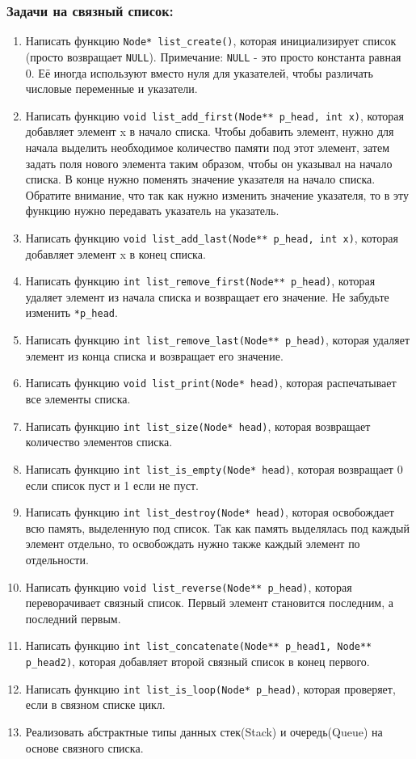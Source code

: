 \documentclass{article}
\begin{document}
\subsubsection*{Задачи на связный список:}
\begin{enumerate}
\item Написать функцию \texttt{Node* list\_create()}, которая инициализирует список (просто возвращает \texttt{NULL}). Примечание: \texttt{NULL} - это просто константа равная 0. Её иногда используют вместо нуля для указателей, чтобы различать числовые переменные и указатели.
\item Написать функцию \texttt{void list\_add\_first(Node** p\_head, int x)}, которая добавляет элемент x в начало списка. Чтобы добавить элемент, нужно для начала выделить необходимое количество памяти под этот элемент, затем задать поля нового элемента таким образом, чтобы он указывал на начало списка. В конце нужно поменять значение указателя на начало списка. Обратите внимание, что так как нужно изменить значение указателя, то в эту функцию нужно передавать указатель на указатель.
\item Написать функцию \texttt{void list\_add\_last(Node** p\_head, int x)}, которая добавляет элемент x в конец списка. 
\item Написать функцию \texttt{int list\_remove\_first(Node** p\_head)}, которая удаляет элемент из начала списка и возвращает его значение. Не забудьте изменить \texttt{*p\_head}.
\item Написать функцию \texttt{int list\_remove\_last(Node** p\_head)}, которая удаляет элемент из конца списка и возвращает его значение. 
\item Написать функцию \texttt{void list\_print(Node* head)}, которая распечатывает все элементы списка.
\item Написать функцию \texttt{int list\_size(Node* head)}, которая возвращает количество элементов списка.
\item Написать функцию \texttt{int list\_is\_empty(Node* head)}, которая возвращает 0 если список пуст и 1 если не пуст.
\item Написать функцию \texttt{int list\_destroy(Node* head)}, которая освобождает всю память, выделенную под список. Так как память выделялась под каждый элемент отдельно, то освобождать нужно также каждый элемент по отдельности.

\item Написать функцию \texttt{void list\_reverse(Node** p\_head)}, которая переворачивает связный список. Первый элемент становится последним, а последний первым. 

\item Написать функцию \texttt{int list\_concatenate(Node** p\_head1, Node** p\_head2)}, которая добавляет второй связный список в конец первого.

\item Написать функцию \texttt{int list\_is\_loop(Node* p\_head)}, которая проверяет, если в связном списке цикл.

\item Реализовать абстрактные типы данных стек(Stack) и очередь(Queue) на основе связного списка. 
\end{enumerate}
\end{document}
